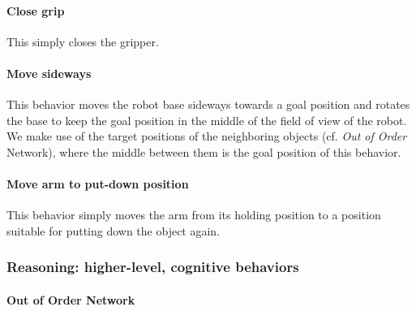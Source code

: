 \paragraph{Close grip} 
\label{grip}
This simply closes the gripper.

\paragraph{Move sideways} 
\label{moveside}
This behavior moves the robot base sideways towards a goal position and rotates the base to keep the goal position in the middle of the field of view of the robot. 
We make use of the target positions of the neighboring objects (cf. \emph{Out of Order} Network), where the middle between them is the goal position of this behavior.

\paragraph{Move arm to put-down position} 
\label{putdownpos}
This behavior simply moves the arm from its holding position to a position suitable for putting down the object again.

\subsubsection{Reasoning: higher-level, cognitive behaviors}%
\label{ssubsec:reasoning_higher_level_cognitive_behaviors}

\paragraph{Out of Order Network} 
\label{outoforder}

